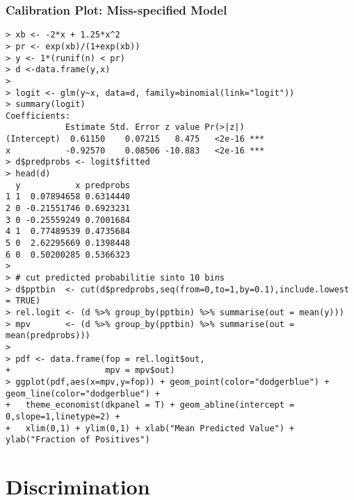 \documentclass[xcolor=dvipsnames]{beamer}
\begin{document}


\begin{frame}[fragile]
\frametitle{Calibration Plot: Miss-specified Model}

\begin{Verbatim}[fontsize=\tiny, frame=single, label=R Code]
> xb <- -2*x + 1.25*x^2
> pr <- exp(xb)/(1+exp(xb))
> y <- 1*(runif(n) < pr)
> d <-data.frame(y,x)
> 
> logit <- glm(y~x, data=d, family=binomial(link="logit"))
> summary(logit)
Coefficients:
            Estimate Std. Error z value Pr(>|z|)    
(Intercept)  0.61150    0.07215   8.475   <2e-16 ***
x           -0.92570    0.08506 -10.883   <2e-16 ***
> d$predprobs <- logit$fitted
> head(d)
  y           x predprobs
1 1  0.07894658 0.6314440
2 0 -0.21551746 0.6923231
3 0 -0.25559249 0.7001684
4 1  0.77489539 0.4735684
5 0  2.62295669 0.1398448
6 0  0.50200285 0.5366323
> 
> # cut predicted probabilitie sinto 10 bins
> d$pptbin  <- cut(d$predprobs,seq(from=0,to=1,by=0.1),include.lowest = TRUE)
> rel.logit <- (d %>% group_by(pptbin) %>% summarise(out = mean(y)))
> mpv       <- (d %>% group_by(pptbin) %>% summarise(out = mean(predprobs)))
> 
> pdf <- data.frame(fop = rel.logit$out,
+                   mpv = mpv$out)
> ggplot(pdf,aes(x=mpv,y=fop)) + geom_point(color="dodgerblue") + geom_line(color="dodgerblue") +
+   theme_economist(dkpanel = T) + geom_abline(intercept = 0,slope=1,linetype=2) +
+   xlim(0,1) + ylim(0,1) + xlab("Mean Predicted Value") + ylab("Fraction of Positives")
\end{Verbatim}

\end{frame}





\section{Discrimination}
\end{document}
